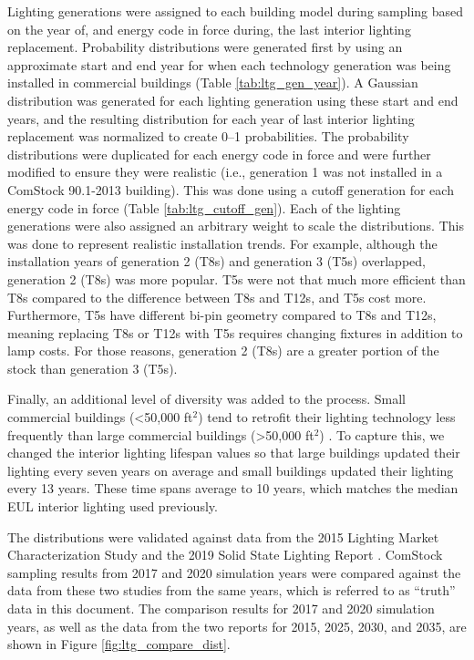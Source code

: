 Lighting generations were assigned to each building model during sampling based on the year of, and energy code in force during, the last interior lighting replacement.  Probability distributions were generated first by using an approximate start and end year for when each technology generation was being installed in commercial buildings (Table \ref{tab:ltg_gen_year}). A Gaussian distribution was generated for each lighting generation using these start and end years, and the resulting distribution for each year of last interior lighting replacement was normalized to create 0--1 probabilities. The probability distributions were duplicated for each energy code in force and were further modified to ensure they were realistic (i.e., generation 1 was not installed in a ComStock 90.1-2013 building). This was done using a cutoff generation for each energy code in force (Table \ref{tab:ltg_cutoff_gen}). Each of the lighting generations were also assigned an arbitrary weight to scale the distributions. This was done to represent realistic installation trends. For example, although the installation years of generation 2 (T8s) and generation 3 (T5s) overlapped, generation 2 (T8s) was more popular. T5s were not that much more efficient than T8s compared to the difference between T8s and T12s, and T5s cost more. Furthermore, T5s have different bi-pin geometry compared to T8s and T12s, meaning replacing T8s or T12s with T5s requires changing fixtures in addition to lamp costs. For those reasons, generation 2 (T8s) are a greater portion of the stock than generation 3 (T5s).



Finally, an additional level of diversity was added to the process.  Small commercial buildings (<50,000 ft$^2$) tend to retrofit their lighting technology less frequently than large commercial buildings (>50,000 ft$^2$) \citep{neea2019cbsa}.  To capture this, we changed the interior lighting lifespan values so that large buildings updated their lighting every seven years on average and small buildings updated their lighting every 13 years. These time spans average to 10 years, which matches the median EUL interior lighting used previously.

The distributions were validated against data from the 2015 Lighting Market Characterization Study \citep{doe2015lmc} and the 2019 Solid State Lighting Report \citep{doe2019ssl}. ComStock sampling results from 2017 and 2020 simulation years were compared against the data from these two studies from the same years, which is referred to as ``truth'' data in this document. The comparison results for 2017 and 2020 simulation years, as well as the data from the two reports for 2015, 2025, 2030, and 2035, are shown in Figure \ref{fig:ltg_compare_dist}.


